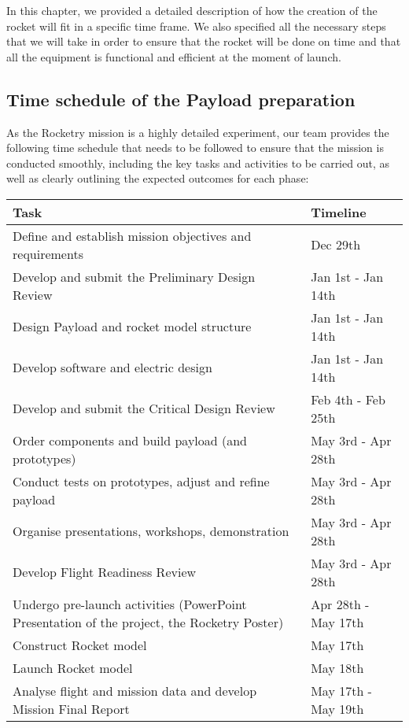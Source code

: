 In this chapter, we provided a detailed description of how the creation of the rocket will fit in a specific time frame. We also specified all the necessary steps that we will take in order to ensure that the rocket will be done on time and that all the equipment is functional and efficient at the moment of launch.

\subsection{Time schedule of the Payload preparation}

As the Rocketry mission is a highly detailed experiment, our team provides the following time schedule that needs to be followed to ensure that the mission is conducted smoothly, including the key tasks and activities to be carried out, as well as clearly outlining the expected outcomes for each phase:

\begin{table}[H]
\centering
\begin{tabularx}{\textwidth}{|X|X|}
\hline
\textbf{Task} & \textbf{Timeline} \\ \hline
Define and establish mission objectives and requirements & Dec 29th \\ \hline
Develop and submit the Preliminary Design Review & Jan 1st - Jan 14th \\ \hline
Design Payload and rocket model structure & Jan 1st - Jan 14th \\ \hline
Develop software and electric design & Jan 1st - Jan 14th \\ \hline
Develop and submit the Critical Design Review & Feb 4th - Feb 25th \\  \hline
Order components and build payload (and prototypes) & May 3rd - Apr 28th \\ \hline
Conduct tests on prototypes, adjust and refine payload & May 3rd - Apr 28th \\ \hline
Organise presentations, workshops, demonstration & May 3rd - Apr 28th \\ \hline
Develop Flight Readiness Review & May 3rd - Apr 28th \\ \hline
Undergo pre-launch activities (PowerPoint Presentation of the project, the Rocketry Poster) & Apr 28th - May 17th \\ \hline
Construct Rocket model & May 17th \\ \hline
Launch Rocket model & May 18th \\ \hline
Analyse flight and mission data and develop Mission Final Report & May 17th - May 19th \\ \hline
\end{tabularx}
\end{table}

